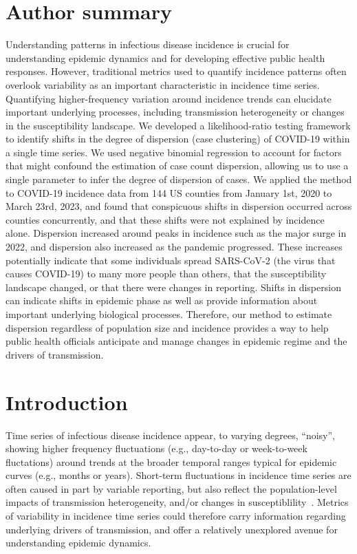 \documentclass[10pt,letterpaper]{article}
\begin{document}
\section*{Author summary}
Understanding patterns in infectious disease incidence is crucial for understanding epidemic dynamics and for developing effective public health responses. However, traditional metrics used to quantify incidence patterns often overlook variability as an important characteristic in incidence time series. Quantifying higher-frequency variation around incidence trends can elucidate important underlying processes, including transmission heterogeneity or changes in the susceptibility landscape.
We developed a likelihood-ratio testing framework to identify shifts in the degree of dispersion (case clustering) of COVID-19  within a single time series. We used negative binomial regression to account for factors that might confound the estimation of case count dispersion, allowing us to use a single parameter to infer the degree of dispersion of cases. 
We applied the method to COVID-19 incidence data from 144 US counties from January 1st, 2020 to March 23rd, 2023, and found that conspicuous shifts in dispersion occurred across counties concurrently, and that these shifts were not explained by incidence alone. 
Dispersion increased around peaks in incidence such as the major surge in 2022, and dispersion also increased as the pandemic progressed. These increases potentially indicate that some individuals spread SARS-CoV-2 (the virus that causes COVID-19) to many more people than others, that the susceptibility landscape changed, or that there were changes in reporting.
Shifts in dispersion can indicate shifts in epidemic phase as well as provide information about important underlying biological processes. Therefore, our method to estimate dispersion regardless of population size and incidence provides a way to help public health officials anticipate and manage changes in epidemic regime and the drivers of transmission. 

\linenumbers

\section*{Introduction}
Time series of infectious disease incidence appear, to varying degrees, ``noisy'', showing higher frequency fluctuations (e.g., day-to-day or week-to-week fluctations) around trends at the broader temporal ranges typical for epidemic curves (e.g., months or years).
Short-term fluctuations in incidence time series are often caused in part by variable reporting, but also reflect the population-level impacts of transmission heterogeneity, and/or changes in susceptiblility~\cite{lloyd-smith_superspreading_2005, kirkegaard2021superspreading, sun_transmission_2021,guo2023statistical,ko2023time}.
Metrics of variability in incidence time series could therefore carry information regarding underlying drivers of transmission, and offer a relatively unexplored avenue for understanding epidemic dynamics. 
\end{document}
